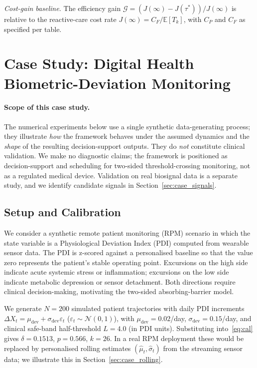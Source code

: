\documentclass[pdflatex,sn-mathphys-num]{sn-jnl}
\theoremstyle{definition}
\newcommand{\E}{\mathbb{E}}
\numberwithin{equation}{section}
\begin{document}
\emph{Cost-gain baseline.} The efficiency gain $\mathcal{G}=(J(\infty)-J(\tau^*))/J(\infty)$ is relative to the reactive-care cost rate $J(\infty)=C_F/\E[T_k]$, with $C_P$ and $C_F$ as specified per table.

\section{Case Study: Digital Health Biometric-Deviation Monitoring}\label{sec:case}

\paragraph{Scope of this case study.} The numerical experiments below use a single synthetic data-generating process; they illustrate \emph{how} the framework behaves under the assumed dynamics and the \emph{shape} of the resulting decision-support outputs. They do \emph{not} constitute clinical validation. We make no diagnostic claims; the framework is positioned as decision-support and scheduling for two-sided threshold-crossing monitoring, not as a regulated medical device. Validation on real biosignal data is a separate study, and we identify candidate signals in Section~\ref{sec:case_signals}.

\subsection{Setup and Calibration}

We consider a synthetic remote patient monitoring (RPM) scenario in which the state variable is a Physiological Deviation Index (PDI) computed from wearable sensor data. The PDI is z-scored against a personalised baseline so that the value zero represents the patient's stable operating point. Excursions on the high side indicate acute systemic stress or inflammation; excursions on the low side indicate metabolic depression or sensor detachment. Both directions require clinical decision-making, motivating the two-sided absorbing-barrier model.

We generate $N{=}200$ simulated patient trajectories with daily PDI increments $\Delta X_t = \mu_{\mathrm{dev}} + \sigma_{\mathrm{dev}}\varepsilon_t$ ($\varepsilon_t\sim\mathcal{N}(0,1)$), with $\mu_{\mathrm{dev}}{=}0.02$/day, $\sigma_{\mathrm{dev}}{=}0.15$/day, and clinical safe-band half-threshold $L{=}4.0$ (in PDI units). Substituting into~\eqref{eq:cal} gives $\delta{=}0.1513$, $p{=}0.566$, $k{=}26$. In a real RPM deployment these would be replaced by personalised rolling estimates $(\hat\mu_t,\hat\sigma_t)$ from the streaming sensor data; we illustrate this in Section~\ref{sec:case_rolling}.
\end{document}
